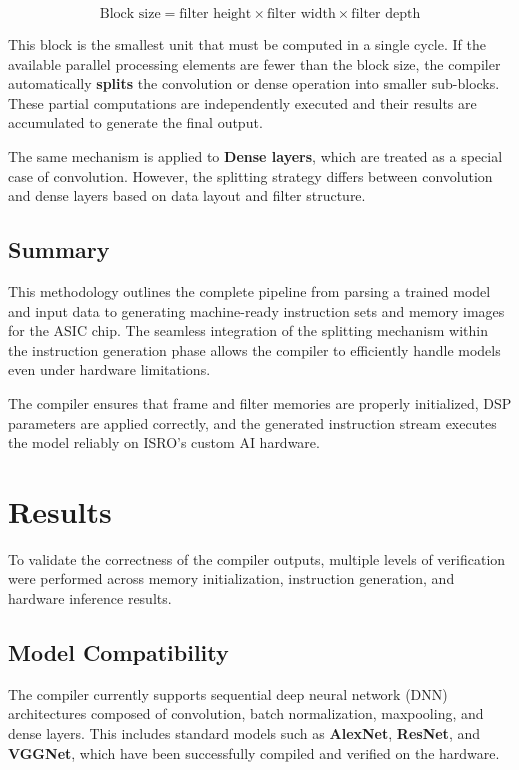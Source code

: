 \documentclass[12pt]{report}
\begin{document}
\[
    \text{Block size} = \text{filter height} \times \text{filter width} \times \text{filter depth}
\]

This block is the smallest unit that must be computed in a single cycle. If the available parallel processing elements are fewer than the block size, the compiler automatically \textbf{splits} the convolution or dense operation into smaller sub-blocks. These partial computations are independently executed and their results are accumulated to generate the final output.

The same mechanism is applied to \textbf{Dense layers}, which are treated as a special case of convolution. However, the splitting strategy differs between convolution and dense layers based on data layout and filter structure.

\section{Summary}

This methodology outlines the complete pipeline from parsing a trained model and input data to generating machine-ready instruction sets and memory images for the ASIC chip. The seamless integration of the splitting mechanism within the instruction generation phase allows the compiler to efficiently handle models even under hardware limitations.

The compiler ensures that frame and filter memories are properly initialized, DSP parameters are applied correctly, and the generated instruction stream executes the model reliably on ISRO’s custom AI hardware.

\chapter{Results}

To validate the correctness of the compiler outputs, multiple levels of verification were performed across memory initialization, instruction generation, and hardware inference results.

\section{Model Compatibility}

The compiler currently supports sequential deep neural network (DNN) architectures composed of convolution, batch normalization, maxpooling, and dense layers. This includes standard models such as \textbf{AlexNet}, \textbf{ResNet}, and \textbf{VGGNet}, which have been successfully compiled and verified on the hardware.
\end{document}
